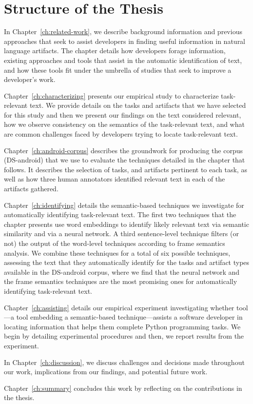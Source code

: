 \section{Structure of the Thesis}
\label{cp1:organization}


In Chapter~\ref{ch:related-work}, we describe background information 
and previous approaches that seek to assist developers in 
finding useful information in natural language artifacts. 
The chapter details 
how developers forage information, existing approaches and tools 
that assist in the automatic
identification of text, and how these tools fit under the 
umbrella of studies that seek to 
improve a developer's work.


Chapter~\ref{ch:characterizing} presents our empirical study to characterize task-relevant text.
We provide details on the tasks and artifacts that we have selected for this study
and then we present our findings on the text considered relevant, 
how we observe consistency on the semantics of the task-relevant text,
and what are common challenges faced by developers trying to locate task-relevant text.


Chapter~\ref{ch:android-corpus} describes the groundwork 
for producing the corpus (\acs{DS-android}) that we use to evaluate the techniques 
detailed in the chapter that follows. It describes the selection of tasks, 
and 
artifacts pertinent to each task,
as well as how three human annotators identified relevant text in each of the artifacts gathered.



Chapter~\ref{ch:identifying} details the semantic-based techniques we investigate for automatically 
identifying task-relevant text.
The first two techniques that the chapter presents 
use word embeddings to identify likely relevant text via semantic similarity
and via a neural network.
A third sentence-level technique filters (or not) 
the output of the word-level techniques according to frame semantics analysis.
We combine these techniques for a total of six possible techniques, 
assessing 
the text that they automatically identify for the tasks and artifact types
available in the \acs{DS-android} corpus,
where we find that the neural network and the frame semantics techniques
are the most promising ones for automatically identifying 
task-relevant text. 




Chapter~\ref{ch:assisting} details our empirical experiment investigating 
whether \acs{tool}---a tool embedding a semantic-based technique---assists a software developer in locating information
that helps them complete Python programming tasks. We begin by detailing experimental procedures
and then, we report results from the experiment.


In Chapter~\ref{ch:discussion}, we discuss challenges and decisions 
made throughout our work, implications from our findings,
and potential future work.


Chapter~\ref{ch:summary} concludes this work by reflecting on the contributions in the thesis. 
